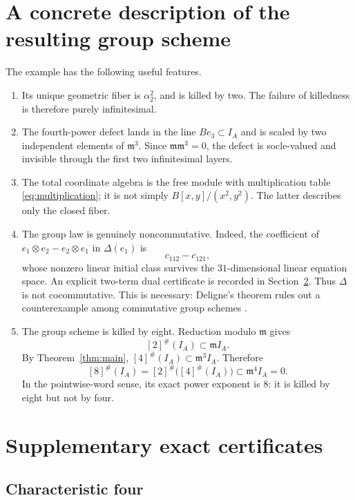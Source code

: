 \documentclass[11pt]{article}
\theoremstyle{remark}
\newcommand{\m}{\mathfrak m}
\begin{document}
\section{A concrete description of the resulting group scheme}

The example has the following useful features.
\begin{enumerate}
\item Its unique geometric fiber is \(\alpha_2^2\), and is killed by two.
The failure of killedness is therefore purely infinitesimal.

\item The fourth-power defect lands in the line \(Be_3\subset I_A\) and is
scaled by two independent elements of \(\m^3\).  Since \(\m\m^3=0\), the
defect is socle-valued and invisible through the first two infinitesimal
layers.

\item The total coordinate algebra is the free module with multiplication
table \eqref{eq:multiplication}; it is not simply
\(B[x,y]/(x^2,y^2)\).  The latter describes only the closed fiber.

\item The group law is genuinely noncommutative.  Indeed, the coefficient of
\(e_1\otimes e_2-e_2\otimes e_1\) in \(\Delta(e_1)\) is
\[
  c_{112}-c_{121},
\]
whose nonzero linear initial class survives the \(31\)-dimensional linear
equation space.  An explicit two-term dual certificate is recorded in
Section~\ref{sec:extra-certificates}.  Thus \(\Delta\) is not cocommutative.
This is necessary: Deligne's theorem rules out a counterexample among
commutative group schemes \cite{SchoofSurvey}.

\item The group scheme is killed by eight.  Reduction modulo \(\m\) gives
\[
  [2]^\#(I_A)\subset\m I_A.
\]
By Theorem~\ref{thm:main},
\([4]^\#(I_A)\subset\m^3I_A\).  Therefore
\[
 [8]^\#(I_A)
 =[2]^\#\bigl([4]^\#(I_A)\bigr)
 \subset\m^4I_A=0.
\]
In the pointwise-word sense, its exact power exponent is \(8\): it is killed
by eight but not by four.
\end{enumerate}

\section{Supplementary exact certificates}\label{sec:extra-certificates}

\subsection{Characteristic four}
\end{document}
